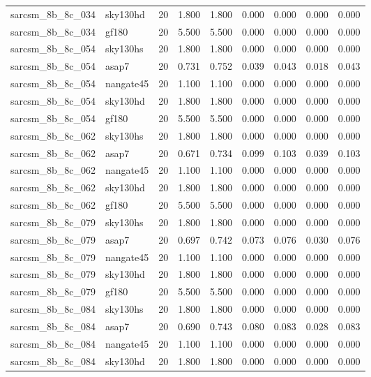 \begin{tabular}{llrrrrrrr}
sarcsm\_8b\_8c\_034 & sky130hd & 20 & 1.800 & 1.800 & 0.000 & 0.000 & 0.000 & 0.000 \\
sarcsm\_8b\_8c\_034 & gf180 & 20 & 5.500 & 5.500 & 0.000 & 0.000 & 0.000 & 0.000 \\
sarcsm\_8b\_8c\_054 & sky130hs & 20 & 1.800 & 1.800 & 0.000 & 0.000 & 0.000 & 0.000 \\
sarcsm\_8b\_8c\_054 & asap7 & 20 & 0.731 & 0.752 & 0.039 & 0.043 & 0.018 & 0.043 \\
sarcsm\_8b\_8c\_054 & nangate45 & 20 & 1.100 & 1.100 & 0.000 & 0.000 & 0.000 & 0.000 \\
sarcsm\_8b\_8c\_054 & sky130hd & 20 & 1.800 & 1.800 & 0.000 & 0.000 & 0.000 & 0.000 \\
sarcsm\_8b\_8c\_054 & gf180 & 20 & 5.500 & 5.500 & 0.000 & 0.000 & 0.000 & 0.000 \\
sarcsm\_8b\_8c\_062 & sky130hs & 20 & 1.800 & 1.800 & 0.000 & 0.000 & 0.000 & 0.000 \\
sarcsm\_8b\_8c\_062 & asap7 & 20 & 0.671 & 0.734 & 0.099 & 0.103 & 0.039 & 0.103 \\
sarcsm\_8b\_8c\_062 & nangate45 & 20 & 1.100 & 1.100 & 0.000 & 0.000 & 0.000 & 0.000 \\
sarcsm\_8b\_8c\_062 & sky130hd & 20 & 1.800 & 1.800 & 0.000 & 0.000 & 0.000 & 0.000 \\
sarcsm\_8b\_8c\_062 & gf180 & 20 & 5.500 & 5.500 & 0.000 & 0.000 & 0.000 & 0.000 \\
sarcsm\_8b\_8c\_079 & sky130hs & 20 & 1.800 & 1.800 & 0.000 & 0.000 & 0.000 & 0.000 \\
sarcsm\_8b\_8c\_079 & asap7 & 20 & 0.697 & 0.742 & 0.073 & 0.076 & 0.030 & 0.076 \\
sarcsm\_8b\_8c\_079 & nangate45 & 20 & 1.100 & 1.100 & 0.000 & 0.000 & 0.000 & 0.000 \\
sarcsm\_8b\_8c\_079 & sky130hd & 20 & 1.800 & 1.800 & 0.000 & 0.000 & 0.000 & 0.000 \\
sarcsm\_8b\_8c\_079 & gf180 & 20 & 5.500 & 5.500 & 0.000 & 0.000 & 0.000 & 0.000 \\
sarcsm\_8b\_8c\_084 & sky130hs & 20 & 1.800 & 1.800 & 0.000 & 0.000 & 0.000 & 0.000 \\
sarcsm\_8b\_8c\_084 & asap7 & 20 & 0.690 & 0.743 & 0.080 & 0.083 & 0.028 & 0.083 \\
sarcsm\_8b\_8c\_084 & nangate45 & 20 & 1.100 & 1.100 & 0.000 & 0.000 & 0.000 & 0.000 \\
sarcsm\_8b\_8c\_084 & sky130hd & 20 & 1.800 & 1.800 & 0.000 & 0.000 & 0.000 & 0.000 \\

\end{tabular}

